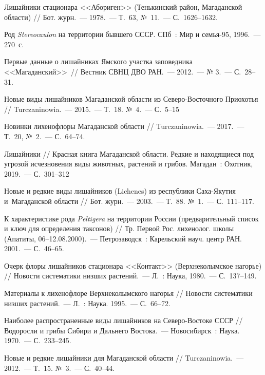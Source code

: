 \begin{thebibliography}{99}
\bibitem{} Лишайники стационара <<Абориген>> (Тенькинский район, Магаданской области) // Бот. журн.~--- 1978.~--- Т.~63, №~11.~--- С.~1626--1632.

\bibitem{} Род \textit{Stereocaulon} на территории бывшего СССР. СПб~: Мир и семья-95, 1996.~--- 270~с.

\bibitem{} Первые данные о лишайниках Ямского участка заповедника <<Магаданский>>~// Вестник СВНЦ ДВО РАН.~--- 2012.~--- № 3.~--- С.~28--31.

\bibitem{} Новые виды лишайников Магаданской области из Северо-Восточного Приохотья // Turczaninowia.~--- 2015.~--- Т.~18. №~4.~--- С.~5--15

\bibitem{} Новинки лихенофлоры Магаданской области // Turczaninowia.~--- 2017.~--- Т.~20, №~2.~--- С.~64--74.

\bibitem{} Лишайники // Красная книга Магаданской области. Редкие и находящиеся под угрозой исчезновения виды животных, растений и грибов. Магадан~: Охотник, 2019.~--- С.~301--312

\bibitem{} Новые и редкие виды лишайников (Lichenes) из республики Саха-Якутия и~Магаданской области // Бот. журн.~--- 2003.~--- Т.~88. №~1.~--- С.~111--117.

\bibitem{} К характеристике рода \textit{Peltigera} на территории России (предварительный список и ключ для определения таксонов) // Тр. Первой Рос. лихенолог. школы (Апатиты, 06–12.08.2000).~--- Петрозаводск~: Карельский науч. центр РАН. 2001.~--- С.~46--65.

\bibitem{} Очерк флоры лишайников стационара <<Контакт>> (Верхнеколымское нагорье) // Новости систематики низших растений.~--- Л.~: Наука, 1980.~--- С.~137--149.

\bibitem{} Материалы к лихенофлоре Верхнеколымского нагорья // Новости систематики низших растений.~--- Л.~: Наука. 1995.~--- С.~66--72.

\bibitem{} Наиболее распространенные виды лишайников на Северо-Востоке СССР // Водоросли и грибы Сибири и Дальнего Востока.~--- Новосибирск~: Наука. 1970.~--- С.~233--245.

\bibitem{} Новые и редкие лишайники для Магаданской области // Turczaninowia.~--- 2012.~--- Т.~15. №~3.~--- С.~40--44.


\end{thebibliography}
